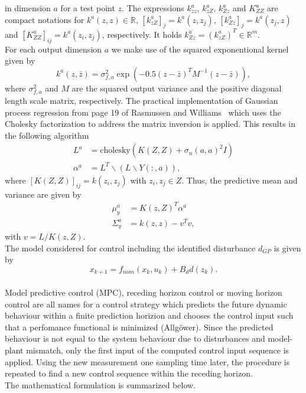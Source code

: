\documentclass[letterpaper, 10 pt, conference]{ieeeconf}  %
\newcommand{\R}{\mathbb{R}}
\begin{document}
in dimension $a$ for a test point $z$.
The expressions $k_{zz}^a$, $ k_{zZ}^a$, $k_{Zz}^a$ and $K_{ZZ}^a$ are compact notations for $k^a(z,z) \in \R$, $[k_{zZ}^a]_j =k^a(z,z_j)$, $[k_{Zz}^a]_j =k^a(z_j,z)$ and $[K_{ZZ}^a]_{ij} = k^a(z_i,z_j)$, respectively. It holds $k_{Zz}^a=(k_{zZ}^a)^T \in \R^m$.\\
For each output dimension $a$ we make use of the squared exponentional kernel given by
\begin{equation}
k^a(z,\bar{z}) = \sigma_{f,a}^2 \exp(-0.5(z-\bar{z})^T M^{-1} (z-\bar{z})),
\end{equation}
where $\sigma_{f,a}^2$ and $M$ are the squared output variance and the positive diagonal length scale matrix, respectively.
The practical implementation of Gaussian process regression from page 19 of Rasmussen and Williams~\cite{williams2006gaussian} which uses the Cholesky factorization to address the matrix inversion is applied. This results in the following algorithm
\begin{align}
L^a &= \text{cholesky}(K(Z,Z) + \sigma_n(a,a)^2I)\\
\alpha^a &= L^T\backslash(L \backslash Y(:,a)),
\end{align}
where $[K(Z,Z)]_{ij}=k(z_i,z_j)$ with $z_i, z_j \in Z$.
Thus, the predictive mean and variance are given by
\begin{align}
\mu_y^a&=K(z,Z)^T\alpha^a\\
\Sigma_y^a&=k(z,z)-v^Tv,
\end{align}
with $v=L/K(z,Z)$.
 \\
The model considered for control including the identified disturbance $d_{GP}$ is given by
\begin{equation}
x_{k+1} = f_{nom}(x_k,u_k) + B_d d(z_k).
\end{equation}
 \\
Model predictive control (MPC), receding  horizon  control or moving horizon control are all names for a control strategy which predicts the future dynamic behaviour within a finite prediction horizion and chooses the control input such that a perfomance functional is minimized (Allgöwer). Since the predicted behaviour is not equal to the system behaviour due to disturbances and model-plant mismatch, only the first input of the computed control input sequence is applied. Using the new measurement one sampling time later, the procedure is repeated to find a new control sequence within the receding horizon.\\
The mathematical formulation is summarized below.
\end{document}
